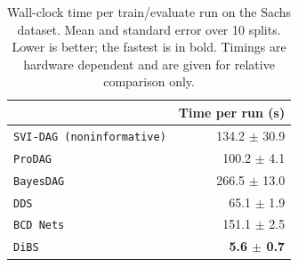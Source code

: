 \begin{table}[ht]
\centering
\caption{Wall-clock time per train/evaluate run on the Sachs dataset. Mean and standard error over 10 splits. Lower is better; the fastest is in bold. Timings are hardware dependent and are given for relative comparison only.}
\label{tab:sachs_runtime}
\small
\begin{tabularx}{\linewidth}{Xr}
\toprule
 & Time per run (s) \\
\midrule
\texttt{SVI-DAG (noninformative)} & 134.2 $\pm$ 30.9 \\
\texttt{ProDAG} & 100.2 $\pm$ 4.1 \\
\texttt{BayesDAG} & 266.5 $\pm$ 13.0 \\
\texttt{DDS} & 65.1 $\pm$ 1.9 \\
\texttt{BCD Nets} & 151.1 $\pm$ 2.5 \\
\texttt{DiBS} & \textbf{5.6 $\pm$ 0.7} \\
\bottomrule
\end{tabularx}
\end{table}
